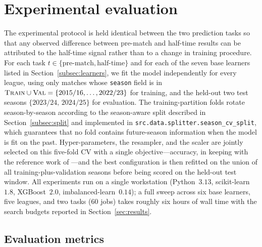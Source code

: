 \documentclass[pdflatex,sn-mathphys-num]{sn-jnl}
\theoremstyle{thmstyleone}
\theoremstyle{thmstyletwo}
\theoremstyle{thmstylethree}
\begin{document}
\section{Experimental evaluation}\label{sec:setup}

The experimental protocol is held identical between the two
prediction tasks so that any observed difference between pre-match
and half-time results can be attributed to the half-time signal
rather than to a change in training procedure. For each task
$t\in\{\text{pre-match},\text{half-time}\}$ and for each of the seven
base learners listed in Section~\ref{subsec:learners}, we fit the
model independently for every league, using only matches whose
\texttt{season} field is in
$\textsc{Train}\cup\textsc{Val}=\{2015/16,\dots,2022/23\}$ for
training, and the held-out two test seasons
$\{2023/24,\,2024/25\}$ for evaluation. The training-partition
folds rotate season-by-season according to the season-aware split
described in Section~\ref{subsec:split} and implemented in
\texttt{src.data.splitter.season\_cv\_split}, which guarantees that
no fold contains future-season information when the model is fit on
the past. Hyper-parameters, the resampler, and the scaler are jointly
selected on this five-fold CV with a single objective---accuracy, in
keeping with the reference work of \cite{bib11}---and the best
configuration is then refitted on the union of all training-plus-validation
seasons before being scored on the held-out test
window. All experiments run on a single workstation
(Python~$3.13$, scikit-learn~$1.8$, XGBoost~$2.0$,
imbalanced-learn~$0.14$); a full sweep across six base learners,
five leagues, and two tasks (60 jobs) takes roughly six hours of
wall time with the search budgets reported in
Section~\ref{sec:results}.

\subsection{Evaluation metrics}\label{subsec:evaluation-metrics}
\end{document}
